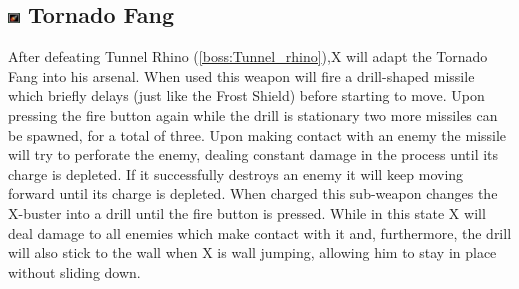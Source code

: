 \subsection{\includegraphics[width=12px, height=10px]{figures/X3/weapons/T_fang.jpg} Tornado Fang}\label{Tornado_Fang}
After defeating Tunnel Rhino (\ref{boss:Tunnel_rhino}),X will adapt the Tornado Fang into his arsenal. When used this weapon will fire a drill-shaped missile which briefly delays (just like the Frost Shield) before starting to move. Upon pressing the fire button again while the drill is stationary two more missiles can be spawned, for a total of three. Upon making contact with an enemy the missile will try to perforate the enemy, dealing constant damage in the process until its charge is depleted. If it successfully destroys an enemy it will keep moving forward until its charge is depleted. When charged this sub-weapon changes the X-buster into a drill until the fire button is pressed. While in this state X will deal damage to all enemies which make contact with it and, furthermore, the drill will also stick to the wall when X is wall jumping, allowing him to stay in place without sliding down.

